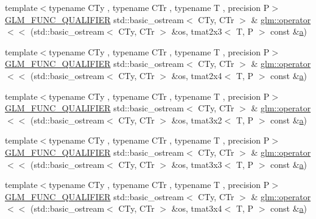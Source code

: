 \begin{DoxyCompactItemize}
\item 
{\footnotesize template$<$typename C\+Ty , typename C\+Tr , typename T , precision P$>$ }\\\mbox{\hyperlink{setup_8hpp_a33fdea6f91c5f834105f7415e2a64407}{G\+L\+M\+\_\+\+F\+U\+N\+C\+\_\+\+Q\+U\+A\+L\+I\+F\+I\+ER}} std\+::basic\+\_\+ostream$<$ C\+Ty, C\+Tr $>$ \& \mbox{\hyperlink{group__gtx__io_ga032043616f87c7eefaf4d83a20f779a5}{glm\+::operator$<$$<$}} (std\+::basic\+\_\+ostream$<$ C\+Ty, C\+Tr $>$ \&os, tmat2x3$<$ T, P $>$ const \&\mbox{\hyperlink{glad_8h_ac8729153468b5dcf13f971b21d84d4e5}{a}})
\item 
{\footnotesize template$<$typename C\+Ty , typename C\+Tr , typename T , precision P$>$ }\\\mbox{\hyperlink{setup_8hpp_a33fdea6f91c5f834105f7415e2a64407}{G\+L\+M\+\_\+\+F\+U\+N\+C\+\_\+\+Q\+U\+A\+L\+I\+F\+I\+ER}} std\+::basic\+\_\+ostream$<$ C\+Ty, C\+Tr $>$ \& \mbox{\hyperlink{group__gtx__io_ga1a2314cab31da0e736bc5e601bcb8f37}{glm\+::operator$<$$<$}} (std\+::basic\+\_\+ostream$<$ C\+Ty, C\+Tr $>$ \&os, tmat2x4$<$ T, P $>$ const \&\mbox{\hyperlink{glad_8h_ac8729153468b5dcf13f971b21d84d4e5}{a}})
\item 
{\footnotesize template$<$typename C\+Ty , typename C\+Tr , typename T , precision P$>$ }\\\mbox{\hyperlink{setup_8hpp_a33fdea6f91c5f834105f7415e2a64407}{G\+L\+M\+\_\+\+F\+U\+N\+C\+\_\+\+Q\+U\+A\+L\+I\+F\+I\+ER}} std\+::basic\+\_\+ostream$<$ C\+Ty, C\+Tr $>$ \& \mbox{\hyperlink{group__gtx__io_gac825ec168ada9209dad314bca460ceef}{glm\+::operator$<$$<$}} (std\+::basic\+\_\+ostream$<$ C\+Ty, C\+Tr $>$ \&os, tmat3x2$<$ T, P $>$ const \&\mbox{\hyperlink{glad_8h_ac8729153468b5dcf13f971b21d84d4e5}{a}})
\item 
{\footnotesize template$<$typename C\+Ty , typename C\+Tr , typename T , precision P$>$ }\\\mbox{\hyperlink{setup_8hpp_a33fdea6f91c5f834105f7415e2a64407}{G\+L\+M\+\_\+\+F\+U\+N\+C\+\_\+\+Q\+U\+A\+L\+I\+F\+I\+ER}} std\+::basic\+\_\+ostream$<$ C\+Ty, C\+Tr $>$ \& \mbox{\hyperlink{group__gtx__io_ga3ea3ca90bea2e763079f09af1e5d50ab}{glm\+::operator$<$$<$}} (std\+::basic\+\_\+ostream$<$ C\+Ty, C\+Tr $>$ \&os, tmat3x3$<$ T, P $>$ const \&\mbox{\hyperlink{glad_8h_ac8729153468b5dcf13f971b21d84d4e5}{a}})
\item 
{\footnotesize template$<$typename C\+Ty , typename C\+Tr , typename T , precision P$>$ }\\\mbox{\hyperlink{setup_8hpp_a33fdea6f91c5f834105f7415e2a64407}{G\+L\+M\+\_\+\+F\+U\+N\+C\+\_\+\+Q\+U\+A\+L\+I\+F\+I\+ER}} std\+::basic\+\_\+ostream$<$ C\+Ty, C\+Tr $>$ \& \mbox{\hyperlink{group__gtx__io_ga5a5ca6f99c027a2277b24de487198fe0}{glm\+::operator$<$$<$}} (std\+::basic\+\_\+ostream$<$ C\+Ty, C\+Tr $>$ \&os, tmat3x4$<$ T, P $>$ const \&\mbox{\hyperlink{glad_8h_ac8729153468b5dcf13f971b21d84d4e5}{a}})

\end{DoxyCompactItemize}
